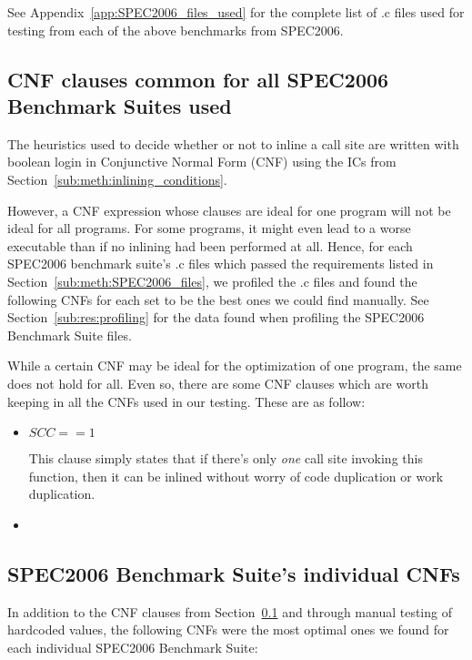 See Appendix~\ref{app:SPEC2006_files_used} for the complete list of .c files
used for testing from each of the above benchmarks from SPEC2006.

\subsection{CNF clauses common for all SPEC2006 Benchmark Suites used}
\label{sub:meth:comon_CNFs}

The heuristics used to decide whether or not to inline a call site are written
with boolean login in Conjunctive Normal Form (CNF) using the ICs from
Section~\ref{sub:meth:inlining_conditions}.

However, a CNF expression whose clauses are ideal for one program will not be
ideal for all programs. For some programs, it might even lead to a worse
executable than if no inlining had been performed at all. Hence, for each
SPEC2006 benchmark suite's .c files which passed the requirements listed in
Section~\ref{sub:meth:SPEC2006_files}, we profiled the .c files and found the
following CNFs for each set to be the best ones we could find manually. See
Section~\ref{sub:res:profiling} for the data found when profiling the SPEC2006
Benchmark Suite files.

While a certain CNF may be ideal for the optimization of one program, the same
does not hold for all. Even so, there are some CNF clauses which are worth
keeping in all the CNFs used in our testing. These are as follow:

\begin{itemize}
	\item $SCC == 1$

This clause simply states that if there's only \textit{one} call site invoking
this function, then it can be inlined without worry of code duplication or work
duplication.

	\item {}
\end{itemize}

\subsection{SPEC2006 Benchmark Suite's individual CNFs}
\label{sub:meth:SPEC2006_heuristics}

In addition to the CNF clauses from Section~\ref{sub:meth:comon_CNFs} and
through manual testing of hardcoded
values, the following CNFs were the most optimal ones we found for each
individual SPEC2006 Benchmark Suite:

